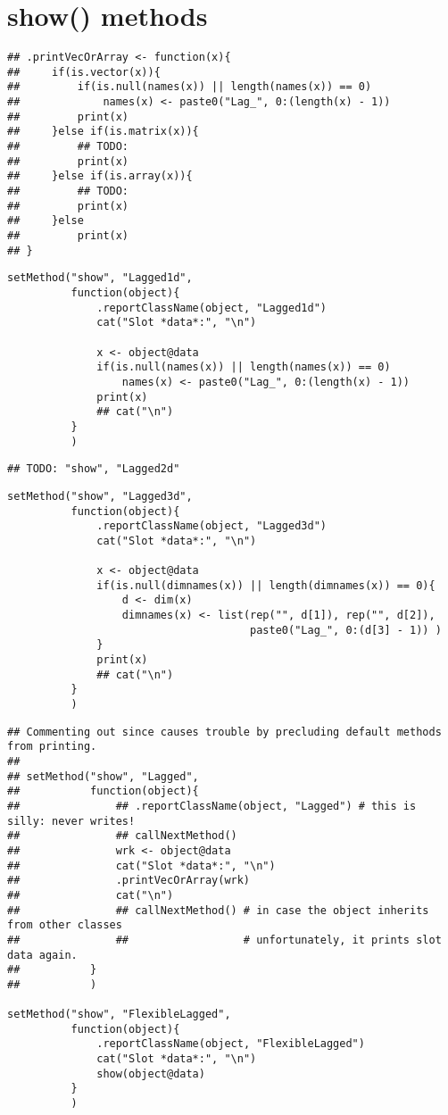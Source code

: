 \documentclass[11pt,a4paper]{article}
\begin{document}
\section{show() methods}
\label{sec:orge77c1a5}

\begin{verbatim}
## .printVecOrArray <- function(x){
##     if(is.vector(x)){
##         if(is.null(names(x)) || length(names(x)) == 0)
##             names(x) <- paste0("Lag_", 0:(length(x) - 1))
##         print(x)
##     }else if(is.matrix(x)){
##         ## TODO:
##         print(x)
##     }else if(is.array(x)){
##         ## TODO:
##         print(x)
##     }else
##         print(x)
## }
\end{verbatim}


\begin{verbatim}
setMethod("show", "Lagged1d",
          function(object){
              .reportClassName(object, "Lagged1d")
              cat("Slot *data*:", "\n")

              x <- object@data
              if(is.null(names(x)) || length(names(x)) == 0)
                  names(x) <- paste0("Lag_", 0:(length(x) - 1))
              print(x)
              ## cat("\n")
          }
          )
\end{verbatim}

\begin{verbatim}
## TODO: "show", "Lagged2d"
\end{verbatim}


\begin{verbatim}
setMethod("show", "Lagged3d",
          function(object){
              .reportClassName(object, "Lagged3d")
              cat("Slot *data*:", "\n")

              x <- object@data
              if(is.null(dimnames(x)) || length(dimnames(x)) == 0){
                  d <- dim(x)
                  dimnames(x) <- list(rep("", d[1]), rep("", d[2]),
                                      paste0("Lag_", 0:(d[3] - 1)) )
              }
              print(x)
              ## cat("\n")
          }
          )
\end{verbatim}

\begin{verbatim}
## Commenting out since causes trouble by precluding default methods from printing.
##
## setMethod("show", "Lagged",
##           function(object){
##               ## .reportClassName(object, "Lagged") # this is silly: never writes!
##               ## callNextMethod()
##               wrk <- object@data
##               cat("Slot *data*:", "\n")
##               .printVecOrArray(wrk)
##               cat("\n")
##               ## callNextMethod() # in case the object inherits from other classes
##               ##                  # unfortunately, it prints slot data again.
##           }
##           )

setMethod("show", "FlexibleLagged",
          function(object){
              .reportClassName(object, "FlexibleLagged")
              cat("Slot *data*:", "\n")
              show(object@data)
          }
          )
\end{verbatim}
\end{document}
